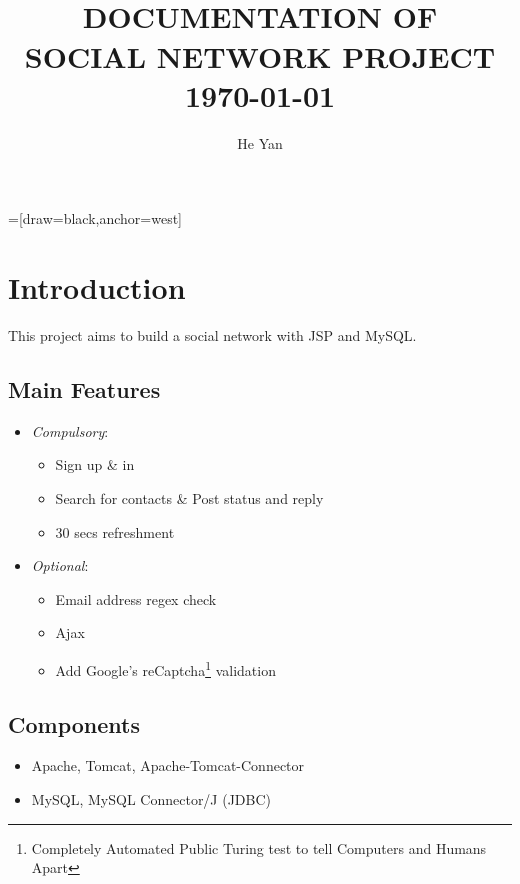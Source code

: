 


=[draw=black,anchor=west]
\title{
        \HRule{2pt}\\
        \LARGE \textbf{\uppercase{Documentation of\\ Social Network Project}}
        \HRule{2pt} \\ [0.5cm]
        \normalsize \today \vspace*{5\baselineskip}}

\date{}

\author{He Yan}

\maketitle
\tableofcontents
\setcounter{page}{0}
\thispagestyle{empty}
\newpage

\section{Introduction}

This project aims to build a social network with JSP and MySQL.

\subsection{Main Features}
\begin{itemize}
	\item \emph{Compulsory}:
		\begin{itemize}
			\item Sign up \& in
			\item Search for contacts \& Post status and reply
			\item 30 secs refreshment
		\end{itemize}
	\item \emph{Optional}:
		\begin{itemize}
			\item Email address regex check
			\item Ajax
			\item Add Google's reCaptcha\footnote{Completely Automated Public Turing test to tell Computers and Humans Apart} validation
		\end{itemize}
\end{itemize}

\subsection{Components}
\begin{itemize}
	\item Apache, Tomcat, Apache-Tomcat-Connector
	\item MySQL, MySQL Connector/J (JDBC)
\end{itemize}

